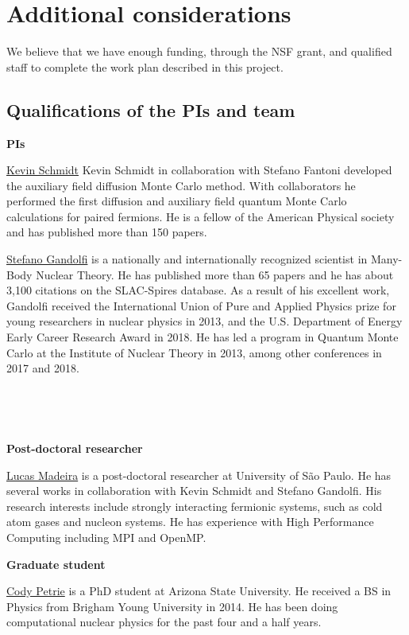 \documentclass[12pt,letterpaper]{article}
\begin{document}
\section{Additional considerations}

We believe that we have enough funding, through the NSF grant, and qualified 
staff to complete the work plan described in this project.

\subsection{Qualifications of the PIs and team}

\textbf{PIs}

\underline{Kevin Schmidt}
Kevin Schmidt in collaboration with Stefano Fantoni developed the
auxiliary field diffusion Monte Carlo method. With collaborators
he performed the first diffusion and auxiliary field quantum
Monte Carlo calculations for paired fermions.  He is a fellow of
the American Physical society and has published more than 150 papers.

\underline{Stefano Gandolfi} is a nationally and 
internationally recognized scientist in Many-Body Nuclear Theory.
He has published more than 65 papers and he has about 
3,100 citations on the SLAC-Spires database.
As a result of his excellent work, 
Gandolfi received the International Union of Pure and Applied Physics prize 
for young researchers in nuclear physics in 2013, and the
U.S. Department of Energy Early Career Research Award in 2018.
He has led a program in 
Quantum Monte Carlo at the Institute of Nuclear Theory in 2013, among other
conferences in 2017 and 2018.

\

\

\textbf{Post-doctoral researcher}

\underline{Lucas Madeira} is a post-doctoral researcher
at University of São Paulo.
He has several works in collaboration with Kevin Schmidt and Stefano
Gandolfi.
His research interests include strongly interacting fermionic systems, such as 
cold atom gases and nucleon systems.
He has experience with High Performance 
Computing including MPI and OpenMP.

\textbf{Graduate student}

\underline{Cody Petrie} is a PhD student at Arizona State University. He 
received a BS in Physics from Brigham Young University in 2014. He has been 
doing computational nuclear physics for the past four and a half years.
\end{document}

